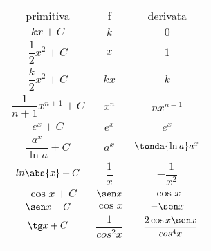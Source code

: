 {%
\newcommand{\mc}[3]{\multicolumn{#1}{#2}{#3}}
\begin{center}
\begin{tabular}{ccc}
primitiva & \qquad f \qquad & derivata\\
\(k x +C\) & \qquad \(k\) & \qquad \(0\)\\
\(\dfrac{1}{2}x^2 +C\) & \qquad \(x\) \qquad & \(1\)\\
\(\dfrac{k}{2}x^2 +C\) & \qquad \(kx\) \qquad & \(k\)\\
\(\dfrac{1}{n+1}x^{n+1} +C\) & \qquad \(x^n\) \qquad & \(nx^{n-1}\)\\
\(e^x +C\) & \qquad \(e^x\) \qquad & \(e^x\)\\
\(\dfrac{a^x}{\ln{a}} +C\) & \qquad \(a^x\) \qquad & \(\tonda{\ln{a}} a^x\)\\
\(ln \abs{x} +C\) & \qquad \(\dfrac{1}{x}\) \qquad & \(-\dfrac{1}{x^2}\)\\
\(-\cos x +C\) & \qquad \(\sen x\) \qquad & \(\cos x\)\\
\(\sen x +C\) & \qquad \(\cos x\) \qquad & \(-\sen x\)\\
\(\tg x +C\) & \qquad \(\dfrac{1}{cos^2 x}\) \qquad & 
    \(-\dfrac{2 \cos x \sen x}{cos^4 x}\)\\
\(\) & \qquad \(\) \qquad & \(\)\\
\end{tabular}
\end{center}
}%


\begin{esempio}
 
\end{esempio}

